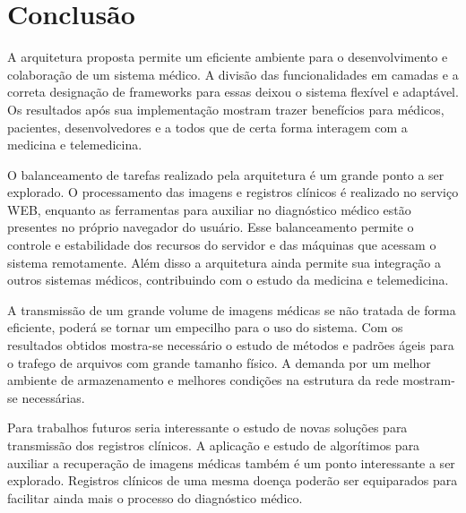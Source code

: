 \section{\esp Conclusão}

A arquitetura proposta permite um eficiente ambiente para o desenvolvimento e colaboração de um sistema médico. A divisão das funcionalidades em camadas e a correta designação de frameworks para essas deixou o sistema flexível e adaptável. Os resultados após sua implementação mostram trazer benefícios para médicos, pacientes, desenvolvedores e a todos que de certa forma interagem com a medicina e telemedicina.

O balanceamento de tarefas realizado pela arquitetura é um grande ponto a ser explorado. O processamento das imagens e registros clínicos é realizado no serviço WEB, enquanto as ferramentas para auxiliar no diagnóstico médico estão presentes no próprio navegador do usuário. Esse balanceamento permite o controle e estabilidade dos recursos do servidor e das máquinas que acessam o sistema remotamente. Além disso a arquitetura ainda permite sua integração a outros sistemas médicos, contribuindo com o estudo da medicina e telemedicina.

A transmissão de um grande volume de imagens médicas se não tratada de forma eficiente, poderá se tornar um empecilho para o uso do sistema. Com os resultados obtidos mostra-se necessário o estudo de métodos e padrões ágeis para o trafego de arquivos com grande tamanho físico. A demanda por um melhor ambiente de armazenamento e melhores condições na estrutura da rede mostram-se necessárias.

Para trabalhos futuros seria interessante o estudo de novas soluções para transmissão dos registros clínicos. A aplicação e estudo de algorítimos para auxiliar a recuperação de imagens médicas também é um ponto interessante a ser explorado. Registros clínicos de uma mesma doença poderão ser equiparados para facilitar ainda mais o processo do diagnóstico médico.


% 
